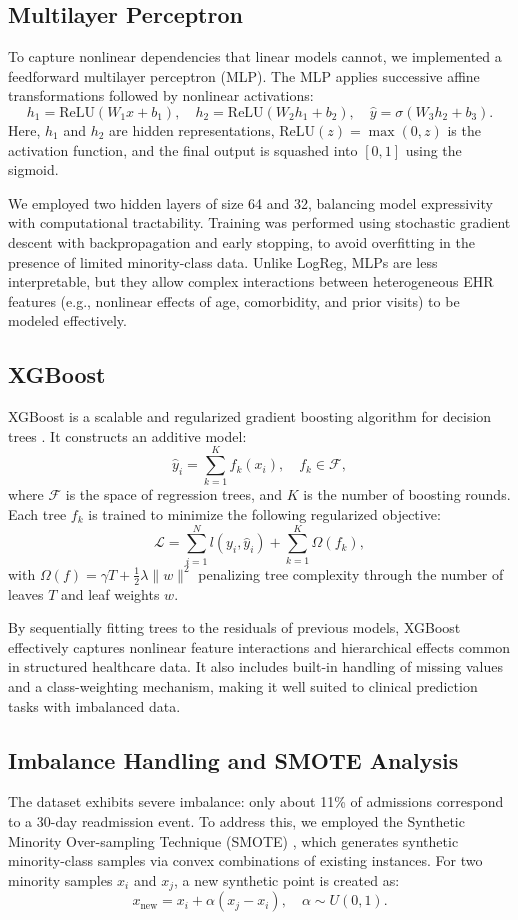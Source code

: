 \subsection{Multilayer Perceptron}
To capture nonlinear dependencies that linear models cannot, we implemented a feedforward multilayer perceptron (MLP). The MLP applies successive affine transformations followed by nonlinear activations:
\[
h_1 = \text{ReLU}(W_1x+b_1), \quad h_2 = \text{ReLU}(W_2h_1+b_2), \quad \hat{y} = \sigma(W_3h_2+b_3).
\]
Here, $h_1$ and $h_2$ are hidden representations, ReLU$(z) = \max(0,z)$ is the activation function, and the final output is squashed into $[0,1]$ using the sigmoid.  

We employed two hidden layers of size 64 and 32, balancing model expressivity with computational tractability. Training was performed using stochastic gradient descent with backpropagation and early stopping, to avoid overfitting in the presence of limited minority-class data. Unlike LogReg, MLPs are less interpretable, but they allow complex interactions between heterogeneous EHR features (e.g., nonlinear effects of age, comorbidity, and prior visits) to be modeled effectively.

\subsection{XGBoost}
XGBoost is a scalable and regularized gradient boosting algorithm for decision trees \cite{chen2016xgboost}. It constructs an additive model:
\[
\hat{y}_i = \sum_{k=1}^K f_k(x_i), \quad f_k \in \mathcal{F},
\]
where $\mathcal{F}$ is the space of regression trees, and $K$ is the number of boosting rounds. Each tree $f_k$ is trained to minimize the following regularized objective:
\[
\mathcal{L} = \sum_{i=1}^N l(y_i, \hat{y}_i) + \sum_{k=1}^K \Omega(f_k),
\]
with $\Omega(f) = \gamma T + \tfrac{1}{2}\lambda \|w\|^2$ penalizing tree complexity through the number of leaves $T$ and leaf weights $w$.  

By sequentially fitting trees to the residuals of previous models, XGBoost effectively captures nonlinear feature interactions and hierarchical effects common in structured healthcare data. It also includes built-in handling of missing values and a class-weighting mechanism, making it well suited to clinical prediction tasks with imbalanced data.

\subsection{Imbalance Handling and SMOTE Analysis}
The dataset exhibits severe imbalance: only about 11\% of admissions correspond to a 30-day readmission event. To address this, we employed the Synthetic Minority Over-sampling Technique (SMOTE) \cite{chawla2002smote}, which generates synthetic minority-class samples via convex combinations of existing instances. For two minority samples $x_i$ and $x_j$, a new synthetic point is created as:
\[
x_{\text{new}} = x_i + \alpha (x_j - x_i), \quad \alpha \sim U(0,1).
\]

